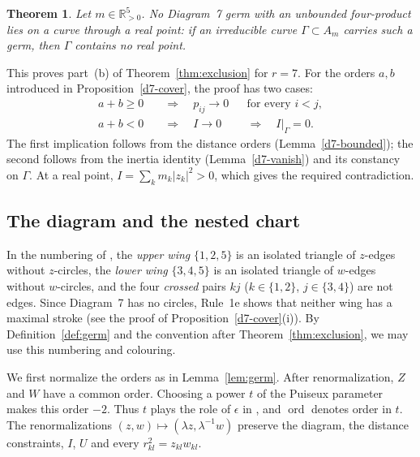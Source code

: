 \documentclass[Threeside,11pt]{article}
\newtheorem{theorem}{Theorem}[section]
\theoremstyle{definition}
\theoremstyle{remark}
\numberwithin{equation}{section}
\theoremstyle{remark}
\newcommand{\Rp}{\mathbb{R}_{>0}}
\newcommand{\ord}{\operatorname{ord}}
\begin{document}
\begin{theorem}\label{thm:d7}
Let $m\in\Rp^5$.  No Diagram~7 germ with an unbounded four-product lies on a curve through a
real point: if an irreducible curve $\Gamma\subset A_m$ carries such a germ, then $\Gamma$
contains no real point.
\end{theorem}

This proves part~(b) of Theorem~\ref{thm:exclusion} for $r=7$.
For the orders $a,b$ introduced in Proposition~\ref{d7-cover}, the proof has
two cases:
\[
\begin{aligned}
a+b\ge0&\quad\Longrightarrow\quad p_{ij}\longrightarrow0
&&\text{for every }i<j,\\
a+b<0&\quad\Longrightarrow\quad I\longrightarrow0
&&\Longrightarrow\quad I|_\Gamma=0.
\end{aligned}
\]
The first implication follows from the distance orders
(Lemma~\ref{d7-bounded}); the second follows from the inertia identity
(Lemma~\ref{d7-vanish}) and its constancy on $\Gamma$.
At a real point, $I=\sum_km_k|z_k|^2>0$, which gives the required contradiction.

\subsection{The diagram and the nested chart}
In the numbering of \cite[\S8.7]{AK}, the \emph{upper wing} $\{1,2,5\}$ is an isolated triangle
of $z$-edges without $z$-circles, the \emph{lower wing} $\{3,4,5\}$ is an isolated triangle of
$w$-edges without $w$-circles, and the four \emph{crossed} pairs $kj$ ($k\in\{1,2\}$,
$j\in\{3,4\}$) are not edges.
Since Diagram~7 has no circles, Rule~1e shows that neither wing has a maximal stroke (see the
proof of Proposition~\ref{d7-cover}(i)).  By Definition~\ref{def:germ} and the convention after
Theorem~\ref{thm:exclusion}, we may use this numbering and colouring.

We first normalize the orders as in Lemma~\ref{lem:germ}.  After renormalization,
$Z$ and $W$ have a common order.  Choosing a power $t$ of the Puiseux parameter makes this
order $-2$.  Thus $t$ plays the role of $\epsilon$ in \cite[\S3]{AK}, and $\ord$ denotes
order in $t$.  The renormalizations $(z,w)\mapsto(\lambda z,\lambda^{-1}w)$ preserve the
diagram, the distance constraints, $I$, $U$ and every $r_{kl}^2=z_{kl}w_{kl}$.
\end{document}

